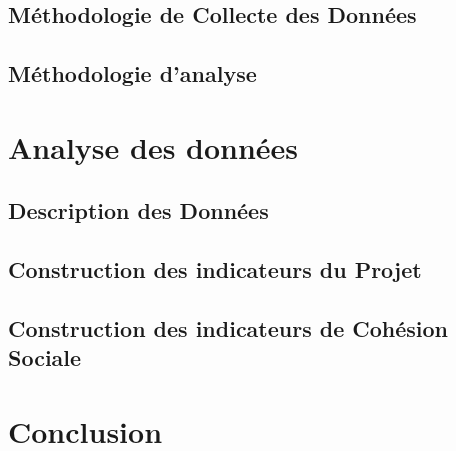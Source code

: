 \documentclass[
]{book}
\begin{document}
\hypertarget{muxe9thodologie-de-collecte-des-donnuxe9es}{%
\section{Méthodologie de Collecte des Données}\label{muxe9thodologie-de-collecte-des-donnuxe9es}}

\hypertarget{muxe9thodologie-danalyse}{%
\section{Méthodologie d'analyse}\label{muxe9thodologie-danalyse}}

\hypertarget{analyse-des-donnuxe9es}{%
\chapter{Analyse des données}\label{analyse-des-donnuxe9es}}

\hypertarget{description-des-donnuxe9es}{%
\section{Description des Données}\label{description-des-donnuxe9es}}

\hypertarget{construction-des-indicateurs-du-projet}{%
\section{Construction des indicateurs du Projet}\label{construction-des-indicateurs-du-projet}}

\hypertarget{construction-des-indicateurs-de-cohuxe9sion-sociale}{%
\section{Construction des indicateurs de Cohésion Sociale}\label{construction-des-indicateurs-de-cohuxe9sion-sociale}}

\hypertarget{conclusion}{%
\chapter{Conclusion}\label{conclusion}}

  
\end{document}
